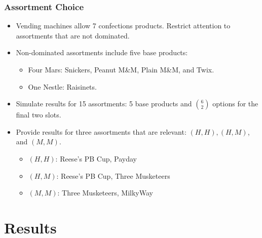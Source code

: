 \documentclass[aspectratio=169]{beamer}
\begin{document}
\begin{frame}[label=main]
\frametitle{Assortment Choice}
\begin{itemize}
\item Vending machines allow 7 confections products. Restrict attention to assortments that are not dominated.
\item Non-dominated assortments include five base products:
\begin{itemize}
\item Four Mars: Snickers, Peanut M\&M, Plain M\&M, and Twix. 
\item One Nestle: Raisinets.
\end{itemize}
\item Simulate results for 15 assortments: 5 base products and $6 \choose 2$ options for the final two slots.
\item Provide results for three assortments that are relevant: $(H,H), (H,M)$, and $(M,M)$.
\begin{itemize}
\item $(H,H)$: Reese's PB Cup, Payday
\item $(H,M)$: Reese's PB Cup, Three Musketeers
\item $(M,M)$: Three Musketeers, MilkyWay
\end{itemize}
\end{itemize}
\hyperlink{supplemental1}{}
\hyperlink{supplemental2}{}
\end{frame}


\section{Results}
\end{document}
